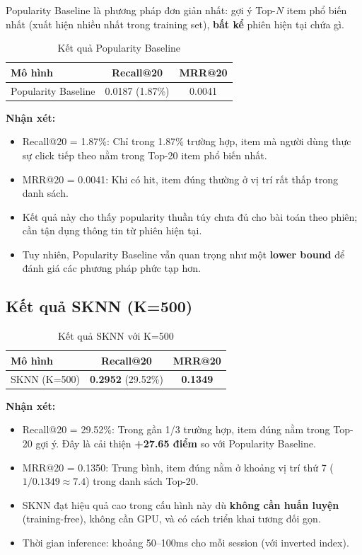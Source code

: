 \documentclass[12pt, a4paper]{article}
\begin{document}
Popularity Baseline là phương pháp đơn giản nhất: gợi ý Top-$N$ item phổ biến nhất (xuất hiện nhiều nhất trong training set), \textbf{bất kể} phiên hiện tại chứa gì.

\begin{table}[H]
\centering
\caption{Kết quả Popularity Baseline}
\label{tab:pop_results}
\begin{tabular}{lcc}
\toprule
\textbf{Mô hình} & \textbf{Recall@20} & \textbf{MRR@20} \\
\midrule
Popularity Baseline & 0.0187 (1.87\%) & 0.0041 \\
\bottomrule
\end{tabular}
\end{table}

\textbf{Nhận xét:}
\begin{itemize}
    \item Recall@20 = 1.87\%: Chỉ trong 1.87\% trường hợp, item mà người dùng thực sự click tiếp theo nằm trong Top-20 item phổ biến nhất.
    \item MRR@20 = 0.0041: Khi có hit, item đúng thường ở vị trí rất thấp trong danh sách.
    \item Kết quả này cho thấy popularity thuần túy chưa đủ cho bài toán theo phiên; cần tận dụng thông tin từ phiên hiện tại.
    \item Tuy nhiên, Popularity Baseline vẫn quan trọng như một \textbf{lower bound} để đánh giá các phương pháp phức tạp hơn.
\end{itemize}

\subsection{Kết quả SKNN (K=500)}

\begin{table}[H]
\centering
\caption{Kết quả SKNN với K=500}
\label{tab:sknn_results}
\begin{tabular}{lcc}
\toprule
\textbf{Mô hình} & \textbf{Recall@20} & \textbf{MRR@20} \\
\midrule
SKNN (K=500) & \textbf{0.2952} (29.52\%) & \textbf{0.1349} \\
\bottomrule
\end{tabular}
\end{table}

\textbf{Nhận xét:}
\begin{itemize}
    \item Recall@20 = 29.52\%: Trong gần 1/3 trường hợp, item đúng nằm trong Top-20 gợi ý. Đây là cải thiện \textbf{+27.65 điểm} so với Popularity Baseline.
    \item MRR@20 = 0.1350: Trung bình, item đúng nằm ở khoảng vị trí thứ 7 ($1/0.1349 \approx 7.4$) trong danh sách Top-20.
    \item SKNN đạt hiệu quả cao trong cấu hình này dù \textbf{không cần huấn luyện} (training-free), không cần GPU, và có cách triển khai tương đối gọn.
    \item Thời gian inference: khoảng 50--100ms cho mỗi session (với inverted index).
\end{itemize}
\end{document}
